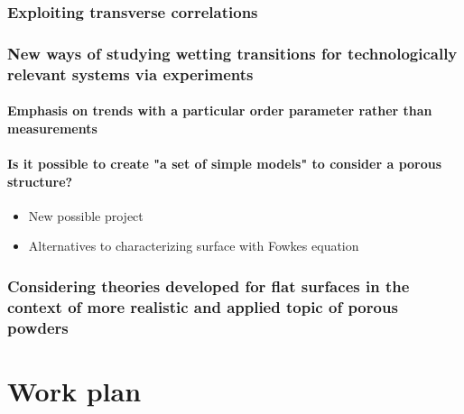 \documentclass[a4paper,12pt,single,pdftex]{scrartcl}
\begin{document}
{\label{ID_625214648}\subsubsection{Exploiting transverse correlations}

\label{ID_1607535616}\subsubsection{New ways of studying wetting transitions for technologically relevant systems via experiments}

\label{ID_825518109}\paragraph{Emphasis on trends with a particular order parameter rather than measurements}

\label{ID_1028951925}\paragraph{Is it possible to create "a set of simple models" to consider a porous structure?}

\begin{itemize}
\label{ID_1602351942}\item New possible project
\label{ID_714004449}\item Alternatives to characterizing surface with Fowkes equation
\end{itemize}
\label{ID_1602351942}\label{ID_714004449}\label{ID_30899692}\subsubsection{Considering theories developed for flat surfaces in the context of more realistic and applied topic of porous powders}

\label{ID_1615838882}\section{Work plan}

}
\end{document}
